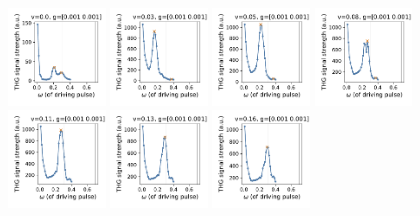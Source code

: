\documentclass[a4paper]{article}
\begin{document}
\begin{figure}[H]
  \centering
  \includegraphics[width=0.23\textwidth]{leggett-driving3-v0-case0.pdf}
  \includegraphics[width=0.23\textwidth]{leggett-driving3-v1-case0.pdf}
  \includegraphics[width=0.23\textwidth]{leggett-driving3-v2-case0.pdf}
  \includegraphics[width=0.23\textwidth]{leggett-driving3-v3-case0.pdf}
  \includegraphics[width=0.23\textwidth]{leggett-driving3-v4-case0.pdf}
  \includegraphics[width=0.23\textwidth]{leggett-driving3-v5-case0.pdf}
  \includegraphics[width=0.23\textwidth]{leggett-driving3-v6-case0.pdf}

\end{figure}
\end{document}
